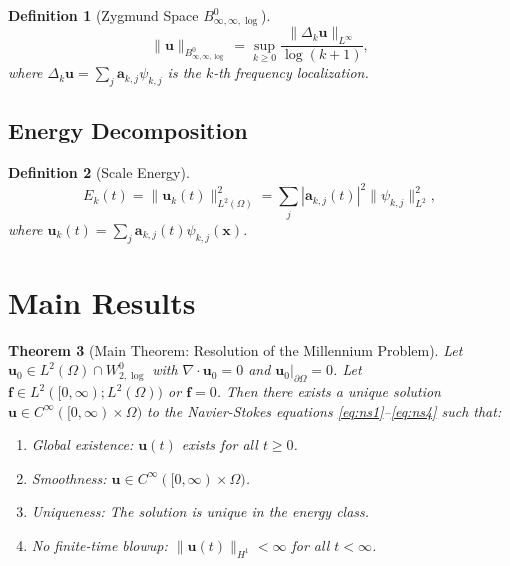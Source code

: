 \documentclass[12pt]{article}
\newtheorem{theorem}{Theorem}
\newtheorem{definition}[theorem]{Definition}
\begin{document}
\begin{definition}[Zygmund Space $B^0_{\infty,\infty,\log}$]
\label{def:zygmund}
\begin{equation}
\|\mathbf{u}\|_{B^0_{\infty,\infty,\log}} = \sup_{k \geq 0} 
\frac{\|\Delta_k \mathbf{u}\|_{L^\infty}}{\log(k + 1)},
\end{equation}
where $\Delta_k \mathbf{u} = \sum_j \mathbf{a}_{k,j} \psi_{k,j}$ is the $k$-th 
frequency localization.
\end{definition}

\subsection{Energy Decomposition}
\begin{definition}[Scale Energy]
\label{def:energy}
\begin{equation}
E_k(t) = \|\mathbf{u}_k(t)\|^2_{L^2(\Omega)} = \sum_j |\mathbf{a}_{k,j}(t)|^2 
\|\psi_{k,j}\|^2_{L^2},
\end{equation}
where $\mathbf{u}_k(t) = \sum_j \mathbf{a}_{k,j}(t) \psi_{k,j}(\mathbf{x})$.
\end{definition}

\section{Main Results}
\label{sec:results}
\begin{theorem}[Main Theorem: Resolution of the Millennium Problem]
\label{thm:main}
Let $\mathbf{u}_0 \in L^2(\Omega) \cap W^0_{2,\log}$ with 
$\nabla \cdot \mathbf{u}_0 = 0$ and $\mathbf{u}_0|_{\partial\Omega} = 0$. 
Let $\mathbf{f} \in L^2([0,\infty); L^2(\Omega))$ or $\mathbf{f} = 0$. 
Then there exists a unique solution 
$\mathbf{u} \in C^\infty([0,\infty) \times \Omega)$ to the Navier-Stokes 
equations \eqref{eq:ns1}--\eqref{eq:ns4} such that:
\begin{enumerate}
  \item Global existence: $\mathbf{u}(t)$ exists for all $t \geq 0$.
  \item Smoothness: $\mathbf{u} \in C^\infty([0,\infty) \times \Omega)$.
  \item Uniqueness: The solution is unique in the energy class.
  \item No finite-time blowup: $\|\mathbf{u}(t)\|_{H^1} < \infty$ for all $t < \infty$.
\end{enumerate}
\end{theorem}
\end{document}

